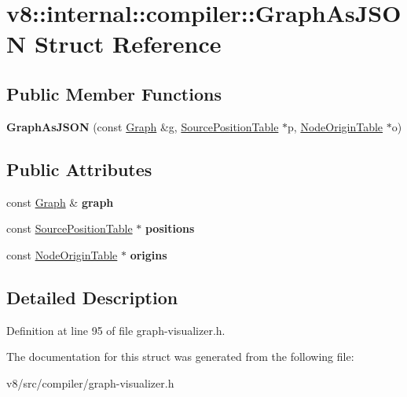\hypertarget{structv8_1_1internal_1_1compiler_1_1GraphAsJSON}{}\section{v8\+:\+:internal\+:\+:compiler\+:\+:Graph\+As\+J\+S\+ON Struct Reference}
\label{structv8_1_1internal_1_1compiler_1_1GraphAsJSON}
\subsection*{Public Member Functions}
\begin{DoxyCompactItemize}
\item 
\mbox{\label{structv8_1_1internal_1_1compiler_1_1GraphAsJSON_a8f9d4a0c58844624d22ab5a5e857035c}} 
{\bfseries Graph\+As\+J\+S\+ON} (const \mbox{\hyperlink{classv8_1_1internal_1_1compiler_1_1Graph}{Graph}} \&g, \mbox{\hyperlink{classv8_1_1internal_1_1compiler_1_1SourcePositionTable}{Source\+Position\+Table}} $\ast$p, \mbox{\hyperlink{classv8_1_1internal_1_1compiler_1_1NodeOriginTable}{Node\+Origin\+Table}} $\ast$o)
\end{DoxyCompactItemize}
\subsection*{Public Attributes}
\begin{DoxyCompactItemize}
\item 
\mbox{\label{structv8_1_1internal_1_1compiler_1_1GraphAsJSON_ae4d456656df18857ddc0765e2c5858b9}} 
const \mbox{\hyperlink{classv8_1_1internal_1_1compiler_1_1Graph}{Graph}} \& {\bfseries graph}
\item 
\mbox{\label{structv8_1_1internal_1_1compiler_1_1GraphAsJSON_af4c6d831a3fd82676bbd4b15f870cf08}} 
const \mbox{\hyperlink{classv8_1_1internal_1_1compiler_1_1SourcePositionTable}{Source\+Position\+Table}} $\ast$ {\bfseries positions}
\item 
\mbox{\label{structv8_1_1internal_1_1compiler_1_1GraphAsJSON_a6dcaad9b975f72dbd054d8f76fa82dd2}} 
const \mbox{\hyperlink{classv8_1_1internal_1_1compiler_1_1NodeOriginTable}{Node\+Origin\+Table}} $\ast$ {\bfseries origins}
\end{DoxyCompactItemize}


\subsection{Detailed Description}


Definition at line 95 of file graph-\/visualizer.\+h.



The documentation for this struct was generated from the following file\+:\begin{DoxyCompactItemize}
\item 
v8/src/compiler/graph-\/visualizer.\+h\end{DoxyCompactItemize}
